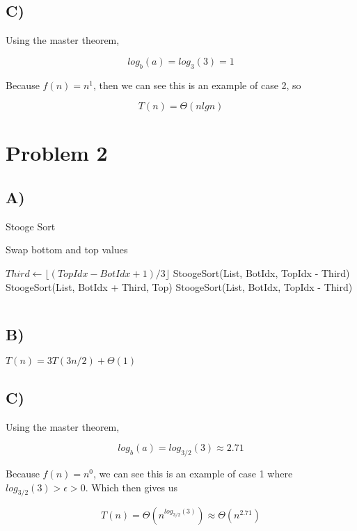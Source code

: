 \documentclass[12pt, letterpaper]{article}
\begin{document}
\subsection*{C)}
Using the master theorem, 

\[ log_b(a) = log_3(3) = 1 \]

Because $f(n) = n^1$, then we can see this is an example of case 2, so

\[ T(n) = \Theta(nlgn) \]

\section*{Problem 2}
\subsection*{A)}

\begin{algorithm}
\caption{Stooge Sort}
\begin{algorithmic}


	\State Swap bottom and top values
\EndIf

	\State $Third \gets \lfloor (TopIdx - BotIdx + 1) / 3 \rfloor$
	\State
	\State StoogeSort(List, BotIdx, TopIdx - Third)
	\State StoogeSort(List, BotIdx + Third, Top)
	\State StoogeSort(List, BotIdx, TopIdx - Third)
\EndIf

\EndProcedure

\end{algorithmic}
\end{algorithm}

\[  \]

\subsection*{B)}
$T(n) = 3T(3n/2) + \Theta(1)$

\subsection*{C)}
Using the master theorem,

\[ log_b(a) = log_{3/2}(3) \approx 2.71 \]

Because $f(n) = n^0$, we can see this is an example of case 1 where $log_{3/2}(3) > \epsilon > 0$. Which then gives us

\[ T(n) = \Theta(n^{log_{3/2}(3)}) \approx \Theta(n^{2.71}) \]
\end{document}
